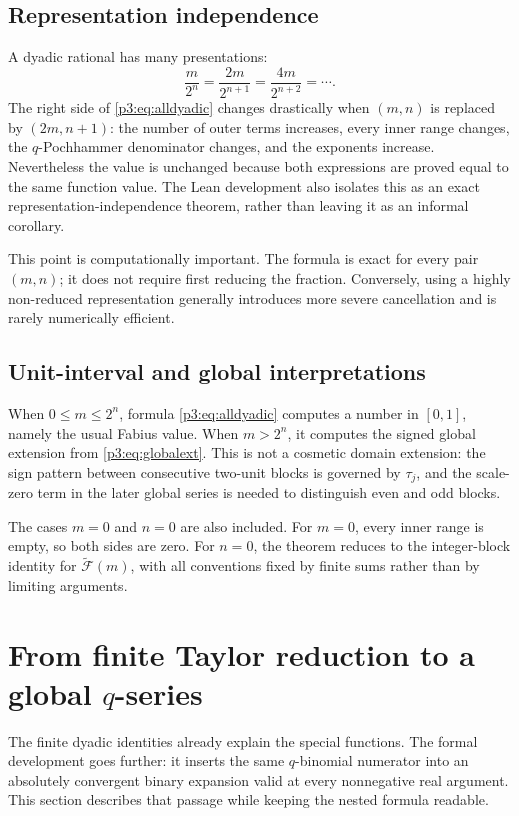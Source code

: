 \documentclass[11pt,oneside]{article}
\theoremstyle{definition}
\theoremstyle{remark}
\newcommand{\G}{\widetilde{\mathcal F}}
\newcommand{\tm}{\tau}
\begin{document}
\subsection{Representation independence}

A dyadic rational has many presentations:
\[
 \frac{m}{2^n}=\frac{2m}{2^{n+1}}=\frac{4m}{2^{n+2}}=\cdots.
\]
The right side of \eqref{p3:eq:alldyadic} changes drastically when $(m,n)$ is
replaced by $(2m,n+1)$: the number of outer terms increases, every inner
range changes, the $q$-Pochhammer denominator changes, and the exponents
increase.  Nevertheless the value is unchanged because both expressions are
proved equal to the same function value.  The Lean development also isolates
this as an exact representation-independence theorem, rather than leaving it
as an informal corollary.

This point is computationally important.  The formula is exact for every
pair $(m,n)$; it does not require first reducing the fraction.  Conversely,
using a highly non-reduced representation generally introduces more severe
cancellation and is rarely numerically efficient.

\subsection{Unit-interval and global interpretations}

When $0\le m\le2^n$, formula \eqref{p3:eq:alldyadic} computes a number in
$[0,1]$, namely the usual Fabius value.  When $m>2^n$, it computes the signed
global extension from \eqref{p3:eq:globalext}.  This is not a cosmetic domain
extension: the sign pattern between consecutive two-unit blocks is governed
by $\tm_j$, and the scale-zero term in the later global series is needed to
distinguish even and odd blocks.

The cases $m=0$ and $n=0$ are also included.  For $m=0$, every inner range
is empty, so both sides are zero.  For $n=0$, the theorem reduces to the
integer-block identity for $\G(m)$, with all conventions fixed by finite sums
rather than by limiting arguments.

\section{From finite Taylor reduction to a global \texorpdfstring{$q$-series}{q-series}}
\label{p3:sec:globalseries}

The finite dyadic identities already explain the special functions.  The
formal development goes further: it inserts the same $q$-binomial numerator
into an absolutely convergent binary expansion valid at every nonnegative
real argument.  This section describes that passage while keeping the nested
formula readable.
\end{document}
